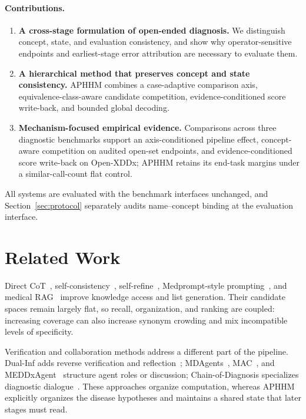 \documentclass[letterpaper]{article} %
\begin{document}
\paragraph{Contributions.}
\begin{enumerate}
  \item \textbf{A cross-stage formulation of open-ended diagnosis.}
  We distinguish concept, state, and evaluation consistency, and show why operator-sensitive endpoints and earliest-stage error attribution are necessary to evaluate them.
  \item \textbf{A hierarchical method that preserves concept and state consistency.}
  APHHM combines a case-adaptive comparison axis, equivalence-class-aware candidate competition, evidence-conditioned score write-back, and bounded global decoding.
  \item \textbf{Mechanism-focused empirical evidence.}
  Comparisons across three diagnostic benchmarks support an axis-conditioned pipeline effect, concept-aware competition on audited open-set endpoints, and evidence-conditioned score write-back on Open-XDDx; APHHM retains its end-task margins under a similar-call-count flat control.
\end{enumerate}

All systems are evaluated with the benchmark interfaces unchanged, and Section~\ref{sec:protocol} separately audits name--concept binding at the evaluation interface.

\section{Related Work}
\label{sec:related}

Direct CoT~\cite{wei2022cot}, self-consistency~\cite{wang2023selfconsistency}, self-refine~\cite{madaan2023selfrefine}, Medprompt-style prompting~\cite{medprompt}, and medical RAG~\cite{lewis2020rag,xiong2024medrag,medrag,imedrag} improve knowledge access and list generation.
Their candidate spaces remain largely flat, so recall, organization, and ranking are coupled: increasing coverage can also increase synonym crowding and mix incompatible levels of specificity.

Verification and collaboration methods address a different part of the pipeline.
Dual-Inf adds reverse verification and reflection~\cite{dualinf2025}; MDAgents~\cite{mdagents}, MAC~\cite{chen2025mac,mac2026}, and MEDDxAgent~\cite{meddxagent2025} structure agent roles or discussion; Chain-of-Diagnosis specializes diagnostic dialogue~\cite{chainofdiagnosis}.
These approaches organize computation, whereas APHHM explicitly organizes the disease hypotheses and maintains a shared state that later stages must read.
\end{document}
